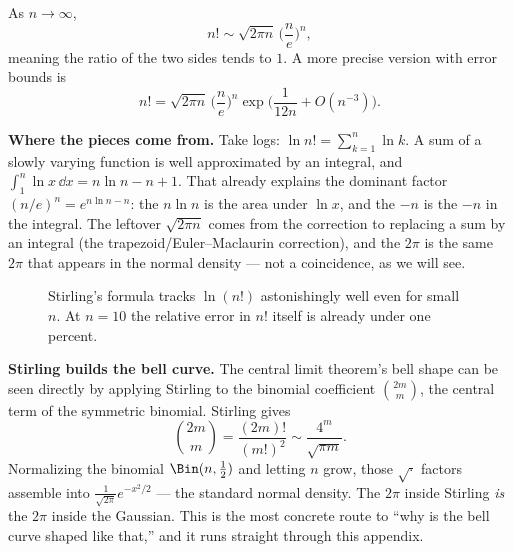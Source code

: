 \begin{theorem}
\label{ch39:stirling}
As $n \to \infty$,
\[
  n! \sim \sqrt{2\pi n}\,\Big(\frac{n}{e}\Big)^{n},
\]
meaning the ratio of the two sides tends to $1$. A more precise version with
error bounds is
\[
  n! = \sqrt{2\pi n}\,\Big(\frac{n}{e}\Big)^{n}
  \exp\!\Big(\frac{1}{12n} + O(n^{-3})\Big).
\]
\end{theorem}

\begin{happeningbox}
\textbf{Where the pieces come from.} Take logs: $\ln n! = \sum_{k=1}^n \ln k$.
A sum of a slowly varying function is well approximated by an integral, and
$\int_1^n \ln x\,\dd x = n\ln n - n + 1$. That already explains the dominant
factor $(n/e)^n = e^{n\ln n - n}$: the $n \ln n$ is the area under $\ln x$, and
the $-n$ is the $-n$ in the integral. The leftover $\sqrt{2\pi n}$ comes from
the correction to replacing a sum by an integral (the trapezoid/Euler--Maclaurin
correction), and the $2\pi$ is the same $2\pi$ that appears in the normal
density --- not a coincidence, as we will see.
\end{happeningbox}

\begin{figure}[H]
\centering
{}
\caption{Stirling's formula tracks $\ln(n!)$ astonishingly well even for small
$n$. At $n=10$ the relative error in $n!$ itself is already under one percent.}
\label{ch39:stirlingfig}
\end{figure}

\begin{applicationbox}
\textbf{Stirling builds the bell curve.} The central limit theorem's bell
shape can be seen directly by applying Stirling to the binomial coefficient
$\binom{2m}{m}$, the central term of the symmetric binomial. Stirling gives
\[
  \binom{2m}{m} = \frac{(2m)!}{(m!)^2} \sim \frac{4^{m}}{\sqrt{\pi m}}.
\]
Normalizing the binomial $\Bin(n,\tfrac12)$ and letting $n$ grow, those
$\sqrt{\cdot}$ factors assemble into $\frac{1}{\sqrt{2\pi}}e^{-x^2/2}$ --- the
standard normal density. The $2\pi$ inside Stirling \emph{is} the $2\pi$ inside
the Gaussian. This is the most concrete route to ``why is the bell curve
shaped like that,'' and it runs straight through this appendix.
\end{applicationbox}

